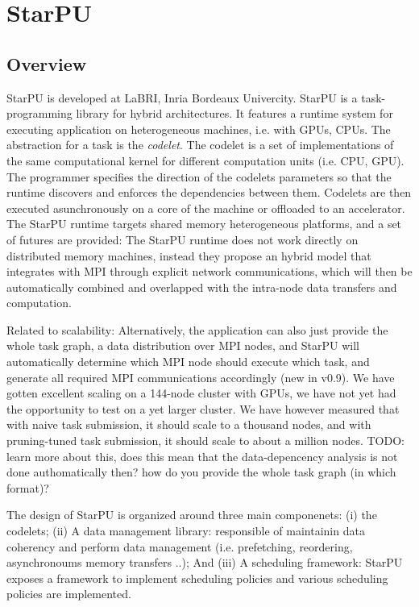 \section{StarPU}

\subsection{Overview}

StarPU is developed at LaBRI, Inria Bordeaux Univercity. 
StarPU is a task-programming library for hybrid architectures. It features a runtime system for executing application on heterogeneous machines, i.e. with GPUs, CPUs. 
The abstraction for a task is the \emph{codelet}. The codelet is a set of implementations of the same computational kernel for different computation units (i.e. CPU, GPU). 
The programmer specifies the direction of the codelets parameters so that the runtime discovers and enforces the dependencies between them.
Codelets are then executed asunchronously on a core of the machine or offloaded to an accelerator. The StarPU runtime targets shared memory heterogeneous platforms, and a set of futures are provided:
The StarPU runtime does not work directly on distributed memory machines, instead they
propose an hybrid model that integrates with MPI through explicit network communications, which will then be automatically combined and overlapped with the intra-node data transfers and computation.

Related to scalability:
Alternatively, the application can also just provide the whole task graph, a data distribution over MPI nodes, and StarPU will automatically determine which MPI node should execute which task, 
and generate all required MPI communications accordingly (new in v0.9). We have gotten excellent scaling on a 144-node cluster with GPUs, we have not yet had the opportunity to test on a yet larger cluster. 
We have however measured that with naive task submission, it should scale to a thousand nodes, and with pruning-tuned task submission, it should scale to about a million nodes. 
TODO: learn more about this, does this mean that the data-depencency analysis is not done authomatically then? how do you provide the whole task graph (in which format)?

The design of StarPU is organized around three main componenets: (i) the codelets; (ii) A data management library: responsible of maintainin data coherency and perform data management (i.e. prefetching, reordering, asynchronoums memory transfers ..); And (iii) A scheduling framework: StarPU exposes a  framework to implement scheduling policies and various scheduling policies are implemented.

